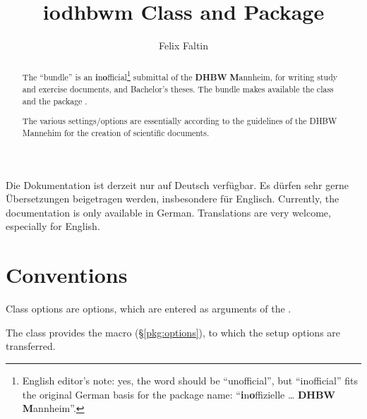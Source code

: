 \documentclass[babel=english,highlight=false]{skdoc}
\title{iodhbwm Class and Package}
\author{Felix Faltin}
\begin{document}

    \maketitle

    \begin{info}{}
        Die Dokumentation ist derzeit nur auf Deutsch verfügbar. Es dürfen sehr gerne Übersetzungen beigetragen werden, insbesondere für Englisch.
        \tcbline
        Currently, the documentation is only available in German. Translations are very welcome, especially for English.
    \end{info}

    \vspace{2\baselineskip}

    \begin{abstract}
    	The  ``bundle'' is an \textbf{i}n\textbf{o}fficial\footnote{English editor's note: yes, the word should be ``unofficial'', but ``inofficial'' fits the original German basis for the package name: ``\textbf{i}n\textbf{o}ffizielle \dots{} \textbf{DHBW} \textbf{M}annheim''.} submittal of the \textbf{DHBW} \textbf{M}annheim, for writing study and exercise documents, and Bachelor's theses. The bundle makes available the class  and the package .
    	
    	The various settings\slash{}options are essentially according to the guidelines of the DHBW Mannehim for the creation of scientific documents.
    \end{abstract}

    \clearpage

    \tableofcontents

    \section{Conventions}

    \begin{description}[leftmargin=!, labelwidth=3.5cm]
        \item[\classOption{Class Options}] Class options are options, which are entered as arguments of the .
        \item[\setupOption{Setup Options}] The class provides the macro \Macro\dhbwsetup (\S{}\ref{pkg:options}), to which the setup options are transferred.
    \end{description}
\end{document}
